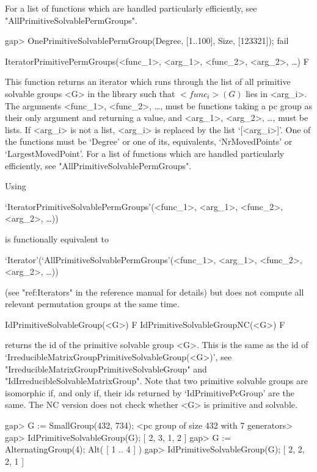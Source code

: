 For a list of functions which are handled particularly efficiently, see
"AllPrimitiveSolvablePermGroups".

\beginexample
gap> OnePrimitiveSolvablePermGroup(Degree, [1..100], Size, [123321]);
fail
\endexample

\>IteratorPrimitivePermGroups(<func_1>, <arg_1>, <func_2>, <arg_2>, \dots) F

This function returns an iterator which runs through the list of all primitive solvable
groups <G> in the  {\IRREDSOL} library such that
$<func_i>(G)$ lies in <arg_i>. The arguments <func_1>, <func_2>, \dots,
must be {\GAP} functions taking a pc group as their only argument and returning 
a value, and <arg_1>, <arg_2>, \dots, 
must be lists. If <arg_i> is not a list, <arg_i> is replaced by the list `[<arg_i>]'.
One of the functions must be `Degree' or one of its, equivalents, `NrMovedPoints' 
or `LargestMovedPoint'.
For a list of functions which are handled particularly efficiently, see
"AllPrimitiveSolvablePermGroups".

Using 

`IteratorPrimitiveSolvablePermGroups'(<func_1>, <arg_1>, <func_2>, <arg_2>, \dots)) 

is functionally equivalent to 

`Iterator'(`AllPrimitiveSolvablePermGroups'(<func_1>, <arg_1>, <func_2>, <arg_2>, \dots))

(see "ref:Iterators" in the {\GAP} reference manual for details) but does not 
compute all relevant permutation groups at the same time. 



\>IdPrimitiveSolvableGroup(<G>) F
\>IdPrimitiveSolvableGroupNC(<G>) F

returns the id of the primitive solvable group <G>. This is the same as
the id of `IrreducibleMatrixGroupPrimitiveSolvableGroup(<G>)', see "IrreducibleMatrixGroupPrimitiveSolvableGroup" and "IdIrreducibleSolvableMatrixGroup".
Note that two primitive solvable groups are isomorphic if, and only if, their
ids returned by `IdPrimitivePcGroup' are the same. The NC version does not
check whether <G> is primitive and solvable.

\beginexample
gap> G := SmallGroup(432, 734);
<pc group of size 432 with 7 generators>
gap> IdPrimitiveSolvableGroup(G);
[ 2, 3, 1, 2 ]
gap> G := AlternatingGroup(4);
Alt( [ 1 .. 4 ] )
gap> IdPrimitiveSolvableGroup(G);
[ 2, 2, 2, 1 ]
\endexample

